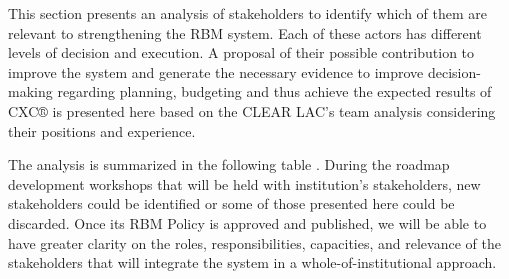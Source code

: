 \documentclass[
  10pt,
]{book}
\begin{document}
This section presents an analysis of stakeholders to identify which of them are relevant to strengthening the RBM system. Each of these actors has different levels of decision and execution. A proposal of their possible contribution to improve the system and generate the necessary evidence to improve decision-making regarding planning, budgeting and thus achieve the expected results of CXC® is presented here based on the CLEAR LAC's team analysis considering their positions and experience.

The analysis is summarized in the following table . During the roadmap development workshops that will be held with institution's stakeholders, new stakeholders could be identified or some of those presented here could be discarded. Once its RBM Policy is approved and published, we will be able to have greater clarity on the roles, responsibilities, capacities, and relevance of the stakeholders that will integrate the system in a whole-of-institutional approach.
\end{document}
